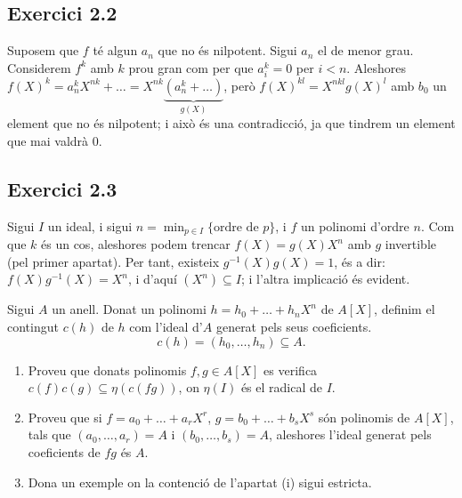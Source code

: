 \documentclass[11pt, a4paper]{article}
\begin{document}
\subsection{Exercici 2.2}
Suposem que $f$ té algun $a_n$ que no és nilpotent. Sigui $a_n$ el de menor grau. Considerem $f^k$ amb $k$ prou gran com per que $a_i^k=0$ per $i<n$. Aleshores $f(X)^k=a^{k}_nX^{nk}+\dots=X^{nk}\underbrace{(a_n^k+\dots)}_{g(X)}$, però $f(X)^{kl}=X^{nkl}g(X)^l$ amb $b_0$ un element que no és nilpotent; i això és una contradicció, ja que tindrem un element que mai valdrà 0.
\subsection{Exercici 2.3}
Sigui $I$ un ideal, i sigui $n=\min_{p\in I}\{\text{ordre de }p\}$, i $f$ un polinomi d'ordre $n$. Com que $k$ és un cos, aleshores podem trencar $f(X)=g(X)X^n$ amb $g$ invertible (pel primer apartat). Per tant, existeix $g^{-1}(X)g(X)=1$, és a dir: $f(X)g^{-1}(X)=X^n$, i d'aquí $(X^n)\subseteq I$; i l'altra implicació és evident.
\newpage
\begin{tcolorbox}[title=\section{Exercici 3}]
    Sigui $A$ un anell. Donat un polinomi $h=h_0+\dots +h_nX^n$ de $A[X]$, definim el contingut $c(h)$ de $h$ com l'ideal d'$A$ generat pels seus coeficients.
    \[
        c(h)=(h_0,\dots,h_n)\subseteq A.
    \]
    \begin{enumerate}
        \item Proveu que donats polinomis $f,g\in A[X]$ es verifica $c(f)c(g)\subseteq\eta(c(fg))$, on $\eta(I)$ és el radical de $I$.
        \item Proveu que si $f=a_0+\dots+a_rX^r$, $g=b_0+\dots+b_sX^s$ són polinomis de $A[X]$, tals que $(a_0,\dots,a_r)=A$ i $(b_0,\dots,b_s)=A$, aleshores l'ideal generat pels coeficients de $fg$ és $A$.
        \item Dona un exemple on la contenció de l'apartat (i) sigui estricta.
    \end{enumerate}
\end{tcolorbox}
\end{document}
